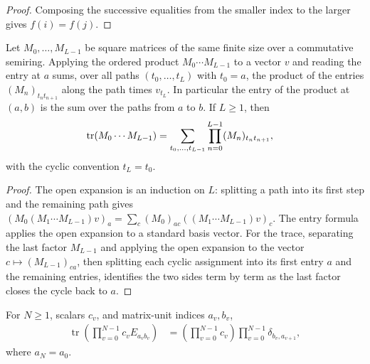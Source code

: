 \begin{proof}
    \leanok
    Composing the successive equalities from the smaller index to the larger
    gives $f(i)=f(j)$.
\end{proof}

\begin{lemma}
    \label{lem:matrix_cyclic_path_sum}
    \leanok
    Let $M_0,\ldots,M_{L-1}$ be square matrices of the same finite size over
    a commutative semiring. Applying the ordered product $M_0\cdots M_{L-1}$
    to a vector $v$ and reading the entry at $a$ sums, over all paths
    $(t_0,\ldots,t_L)$ with $t_0=a$, the product of the entries
    $(M_n)_{t_n t_{n+1}}$ along the path times $v_{t_L}$. In particular the
    entry of the product at $(a,b)$ is the sum over the paths from $a$ to $b$.
    If $L\ge1$, then
    \begin{align}
        \operatorname{tr}(M_0\cdots M_{L-1})
         & =\sum_{t_0,\ldots,t_{L-1}}\prod_{n=0}^{L-1}(M_n)_{t_n t_{n+1}},
        \notag
    \end{align}
    with the cyclic convention $t_L=t_0$.
\end{lemma}

\begin{proof}
    \leanok
    The open expansion is an induction on $L$: splitting a path into its
    first step and the remaining path gives
    $(M_0(M_1\cdots M_{L-1})v)_a=\sum_c(M_0)_{ac}((M_1\cdots M_{L-1})v)_c$.
    The entry formula applies the open expansion to a standard basis vector.
    For the trace, separating the last factor $M_{L-1}$ and applying the
    open expansion to the vector $c\mapsto(M_{L-1})_{ca}$, then splitting
    each cyclic assignment into its first entry $a$ and the remaining
    entries, identifies the two sides term by term as the last factor closes
    the cycle back to $a$.
\end{proof}

\begin{lemma}
    \label{lem:asymex_ising_unit_loop}
    \leanok
    For $N\geq1$, scalars $c_v$, and matrix-unit indices $a_v,b_v$,
    \begin{align}
        \operatorname{tr}\!\left(\prod_{v=0}^{N-1}c_vE_{a_vb_v}\right)
         & =\left(\prod_{v=0}^{N-1}c_v\right)
        \prod_{v=0}^{N-1}\delta_{b_v,a_{v+1}},
        \label{eq:asymex_ising_unit_loop}
    \end{align}
    where $a_N=a_0$.
\end{lemma}


